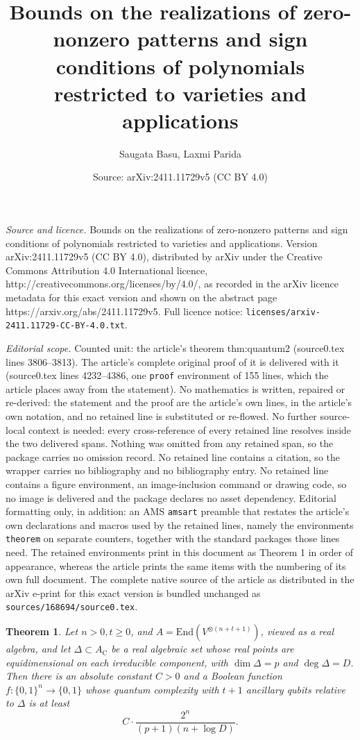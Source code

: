 \documentclass[10pt,a4paper]{amsart}
\title{Bounds on the realizations of zero-nonzero patterns and sign conditions of polynomials restricted to varieties and applications}
\author{Saugata Basu, Laxmi Parida}
\date{Source: arXiv:2411.11729v5 (CC BY 4.0)}
\newtheorem{theorem}{Theorem}
\newcommand {\C}     {\mathrm{C}}
\newcommand{\End}{\mathrm{End}}
\begin{document}
\maketitle

\noindent\emph{Source and licence.} Bounds on the realizations of zero-nonzero patterns and sign conditions of polynomials restricted to varieties and applications. Version arXiv:2411.11729v5 (CC BY 4.0), distributed by arXiv under the Creative Commons Attribution 4.0 International licence, http://creativecommons.org/licenses/by/4.0/, as recorded in the arXiv licence metadata for this exact version and shown on the abstract page https://arxiv.org/abs/2411.11729v5. Full licence notice: \texttt{licenses/arxiv-2411.11729-CC-BY-4.0.txt}.\par\smallskip

\noindent\textit{Editorial scope.} Counted unit: the article's theorem thm:quantum2 (source0.tex lines 3806--3813). The article's complete original proof of it is delivered with it (source0.tex lines 4232--4386, one \texttt{proof} environment of 155 lines, which the article places away from the statement). No mathematics is written, repaired or re-derived: the statement and the proof are the article's own lines, in the article's own notation, and no retained line is substituted or re-flowed.  No further source-local context is needed: every cross-reference of every retained line resolves inside the two delivered spans.  Nothing was omitted from any retained span, so the package carries no omission record.  No retained line contains a citation, so the wrapper carries no bibliography and no bibliography entry.  No retained line contains a figure environment, an image-inclusion command or drawing code, so no image is delivered and the package declares no asset dependency.  Editorial formatting only, in addition: an AMS \texttt{amsart} preamble that restates the article's own declarations and macros used by the retained lines, namely the environments \texttt{theorem} on separate counters, together with the standard packages those lines need.  The retained environments print in this document as Theorem 1 in order of appearance, whereas the article prints the same items with the numbering of its own full document.  The complete native source of the article as distributed in the arXiv e-print for this exact version is bundled unchanged as \texttt{sources/168694/source0.tex}.
\begin{theorem}
\label{thm:quantum2}
\label{cor:15}
Let $n>0, t \geq 0$, and  $A=\End(V^{\otimes(n+t+1)})$, viewed as a real algebra, and let $\Delta\subset A_\C$ be a real algebraic set whose real points are equidimensional on each irreducible component, with $\dim\Delta=p$ and $\deg\Delta=D$. Then there is an absolute constant $C>0$ and a Boolean function $f:\{0,1\}^n\to\{0,1\}$ whose quantum complexity with $t+1$ ancillary qubits relative to $\Delta$ is at least
\[
C\cdot\frac{2^n}{(p+1)(n+\log D)}.
\]
\end{theorem}
\end{document}
